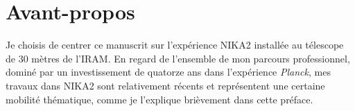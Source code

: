 \documentclass[a4paper, 12pt]{report}
\begin{document}




%
\newpage
\tableofcontents
\newpage


% 
%

\chapter*{Avant-propos}

Je choisis de centrer ce manuscrit sur l'expérience NIKA2 installée au
télescope de 30 mètres de l'IRAM. En regard de l'ensemble de mon parcours
professionnel, dominé par un investissement de quatorze ans dans
l'expérience \emph{Planck}, mes travaux dans NIKA2 sont relativement récents
et représentent une certaine mobilité thématique, comme je l'explique
brièvement dans cette préface. 
\end{document}

